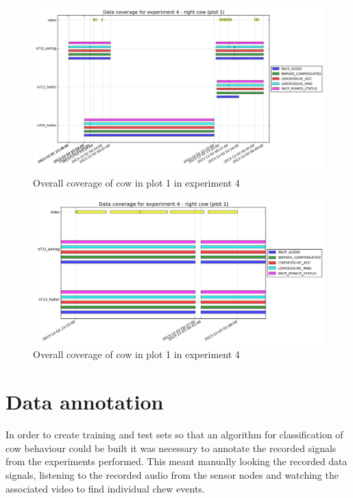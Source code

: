 \begin{figure}[ht!]
\begin{center}
\leavevmode
\includegraphics[width=1\textwidth]{images/experiment4_coverage_overall.png}
\end{center}
\caption{Overall coverage of cow in plot 1 in experiment 4}
\label{exp4overall}
\end{figure}

\begin{figure}[ht!]
\begin{center}
\leavevmode
\includegraphics[width=1\textwidth]{images/experiment4_coverage_zoomed.png}
\end{center}
\caption{Overall coverage of cow in plot 1 in experiment 4}
\label{exp4overall}
\end{figure}

\section{Data annotation}

In order to create training and test sets so that an algorithm for classification of cow behaviour could be built it was necessary to annotate the recorded signals from the experiments performed. This meant manually looking the recorded data signals, listening to the recorded audio from the sensor nodes and watching the associated video to find individual chew events. 

